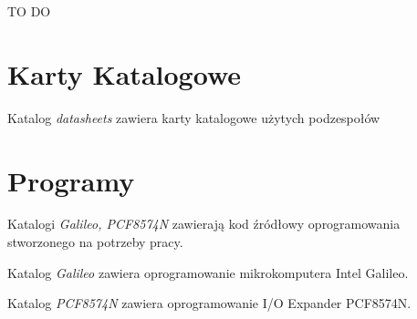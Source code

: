 \documentclass{xmgr}
\begin{document}
\summary
TO DO

\appendix
\chapter{Karty Katalogowe}
Katalog \emph{datasheets} zawiera karty katalogowe użytych podzespołów
\chapter{Programy}
Katalogi \emph{Galileo, PCF8574N} zawierają kod źródłowy oprogramowania stworzonego na potrzeby pracy. 

\noindent Katalog \emph{Galileo} zawiera oprogramowanie mikrokomputera Intel Galileo.

\noindent Katalog \emph{PCF8574N} zawiera oprogramowanie I/O Expander PCF8574N.




\listoftables

\listoffigures

\oswiadczenie
\end{document}
